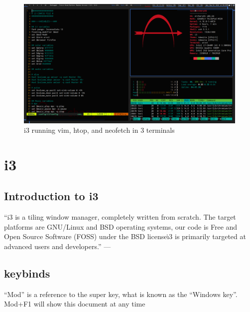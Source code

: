 \documentclass{article}
\begin{document}
\begin{center}
\begin{figure}
\includegraphics[width=\textwidth]{i3wm.png}
	\caption{i3 running vim, htop, and neofetch in 3 terminals}
\end{figure}
\end{center}
\section{i3}
\subsection{Introduction to i3}
``i3 is a tiling window manager, completely written from scratch. The target platforms are GNU/Linux and BSD operating systems, our code is Free and Open Source Software (FOSS) under the BSD license\. \i3 is primarily targeted at advanced users and developers.'' --- \textcite{i3wm}

\subsection{keybinds}
``Mod'' is a reference to the super key, what is known as the ``Windows key''.
Mod+F1 will show this document at any time
\end{document}
